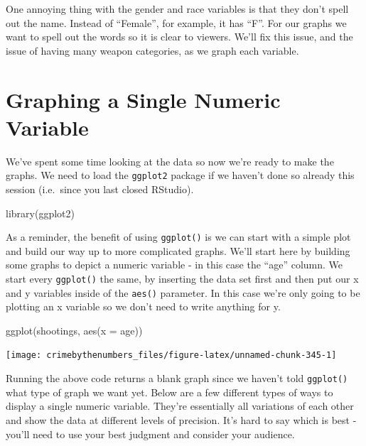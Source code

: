 \documentclass[
]{krantz}
\makeatletter
\newenvironment{Shaded}{\begin{snugshade}}{\end{snugshade}}
\newcommand{\AttributeTok}[1]{\textcolor[rgb]{0.61,0.61,0.61}{#1}}
\newcommand{\FunctionTok}[1]{\textcolor[rgb]{0,0,0}{#1}}
\newcommand{\NormalTok}[1]{#1}
\newenvironment{kframe}{%
\medskip{}
\setlength{\fboxsep}{.8em}
 \def\at@end@of@kframe{}%
 \ifinner\ifhmode%
  \def\at@end@of@kframe{\end{minipage}}%
  \begin{minipage}{\columnwidth}%
 \fi\fi%
 \def\FrameCommand##1{\hskip\@totalleftmargin \hskip-\fboxsep
 \colorbox{shadecolor}{##1}\hskip-\fboxsep
     \hskip-\linewidth \hskip-\@totalleftmargin \hskip\columnwidth}%
 \MakeFramed {\advance\hsize-\width
   \@totalleftmargin\z@ \linewidth\hsize
   \@setminipage}}%
 {\par\unskip\endMakeFramed%
 \at@end@of@kframe}
\renewenvironment{Shaded}{\begin{kframe}}{\end{kframe}}
\makeatother
\begin{document}
One annoying thing with the gender and race variables is that they don't spell out the name. Instead of ``Female'', for example, it has ``F''. For our graphs we want to spell out the words so it is clear to viewers. We'll fix this issue, and the issue of having many weapon categories, as we graph each variable.

\hypertarget{graphing-a-single-numeric-variable}{%
\section{Graphing a Single Numeric Variable}\label{graphing-a-single-numeric-variable}}

We've spent some time looking at the data so now we're ready to make the graphs. We need to load the \texttt{ggplot2} package if we haven't done so already this session (i.e.~since you last closed RStudio).

\begin{Shaded}
\begin{Highlighting}[]
\FunctionTok{library}\NormalTok{(ggplot2)}
\end{Highlighting}
\end{Shaded}

As a reminder, the benefit of using \texttt{ggplot()} is we can start with a simple plot and build our way up to more complicated graphs. We'll start here by building some graphs to depict a numeric variable - in this case the ``age'' column. We start every \texttt{ggplot()} the same, by inserting the data set first and then put our x and y variables inside of the \texttt{aes()} parameter. In this case we're only going to be plotting an x variable so we don't need to write anything for y.

\begin{Shaded}
\begin{Highlighting}[]
\FunctionTok{ggplot}\NormalTok{(shootings, }\FunctionTok{aes}\NormalTok{(}\AttributeTok{x =}\NormalTok{ age))}
\end{Highlighting}
\end{Shaded}

\begin{center}\texttt{[image: crimebythenumbers\_files/figure-latex/unnamed-chunk-345-1]} \end{center}

Running the above code returns a blank graph since we haven't told \texttt{ggplot()} what type of graph we want yet. Below are a few different types of ways to display a single numeric variable. They're essentially all variations of each other and show the data at different levels of precision. It's hard to say which is best - you'll need to use your best judgment and consider your audience.
\end{document}

